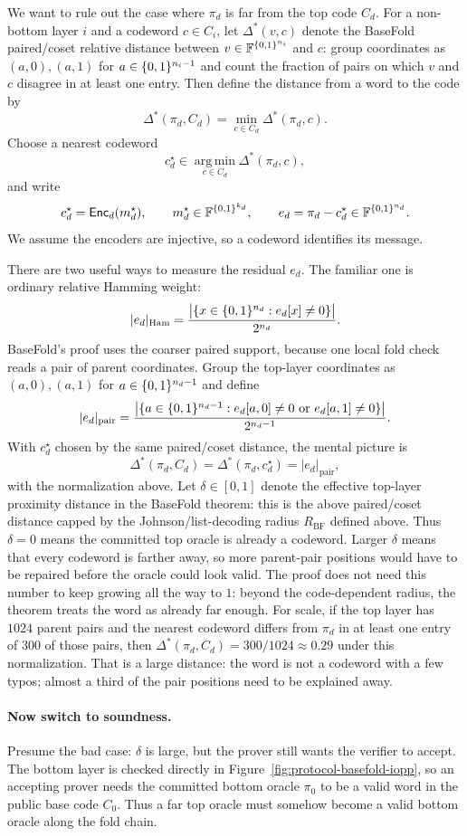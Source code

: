 We want to rule out the case where $\pi_d$ is far from the top code $C_d$.
For a non-bottom layer $i$ and a codeword $c\in C_i$, let
$\Delta^*(v,c)$ denote the BaseFold paired/coset relative distance between
$v\in\mathbb{F}^{\{0,1\}^{n_i}}$ and $c$: group coordinates as $(a,0),(a,1)$ for
$a\in\{0,1\}^{n_i-1}$ and count the fraction of pairs on which $v$ and $c$ disagree
in at least one entry.  Then define the distance from a word to the code by
\[
  \Delta^*(\pi_d,C_d)
  =
  \min_{c\in C_d}\Delta^*(\pi_d,c).
\]
Choose a nearest codeword
\[
  c_d^\star
  \in
  \operatorname*{arg\,min}_{c\in C_d}\Delta^*(\pi_d,c),
\]
and write
\[
  c_d^\star=\mathsf{Enc}_d(m_d^\star),
  \qquad
  m_d^\star\in\mathbb{F}^{\{0,1\}^{k_d}},
  \qquad
  e_d=\pi_d-c_d^\star\in\mathbb{F}^{\{0,1\}^{n_d}}.
\]
We assume the encoders are injective, so a codeword identifies its message.

There are two useful ways to measure the residual $e_d$.  The familiar one is
ordinary relative Hamming weight:
\[
  |e_d|_{\mathrm{Ham}}
  =
  \frac{
    \bigl|\{x\in\{0,1\}^{n_d}:e_d[x]\ne0\}\bigr|
  }{
    2^{n_d}
  }.
\]
BaseFold's proof uses the coarser paired support, because one local fold check
reads a pair of parent coordinates.  Group the top-layer coordinates as
$(a,0),(a,1)$ for $a\in\{0,1\}^{n_d-1}$ and define
\[
  |e_d|_{\mathrm{pair}}
  =
  \frac{
    \bigl|\{a\in\{0,1\}^{n_d-1}:e_d[a,0]\ne0\text{ or }e_d[a,1]\ne0\}\bigr|
  }{
    2^{n_d-1}
  }.
\]
With $c_d^\star$ chosen by the same paired/coset distance, the mental picture is
\[
  \Delta^*(\pi_d,C_d)
  =
  \Delta^*(\pi_d,c_d^\star)
  =
  |e_d|_{\mathrm{pair}},
\]
with the normalization above.  Let
$\delta\in[0,1]$ denote the effective top-layer proximity distance in the
BaseFold theorem: this is the above paired/coset distance capped by the
Johnson/list-decoding radius $R_{\mathrm{BF}}$ defined above.
Thus $\delta=0$ means the committed top oracle is already a codeword.  Larger
$\delta$ means that every codeword is farther away, so more parent-pair positions
would have to be repaired before the oracle could look valid.  The proof does
not need this number to keep growing all the way to $1$: beyond the
code-dependent radius, the theorem treats the word as already far enough.
For scale, if the top layer has $1024$ parent pairs and the nearest codeword
differs from $\pi_d$ in at least one entry of $300$ of those pairs, then
$\Delta^*(\pi_d,C_d)=300/1024\approx0.29$ under this normalization.  That is a
large distance: the word is not a codeword with a few typos; almost a third of
the pair positions need to be explained away.

\paragraph{Now switch to soundness.}
Presume the bad case: $\delta$ is large, but the prover still wants the verifier
to accept.  The bottom layer is checked directly in
Figure~\ref{fig:protocol-basefold-iopp}, so an accepting prover needs the
committed bottom oracle $\pi_0$ to be a valid word in the public base code
$C_0$.  Thus a far top oracle must somehow become a valid bottom oracle along
the fold chain.

